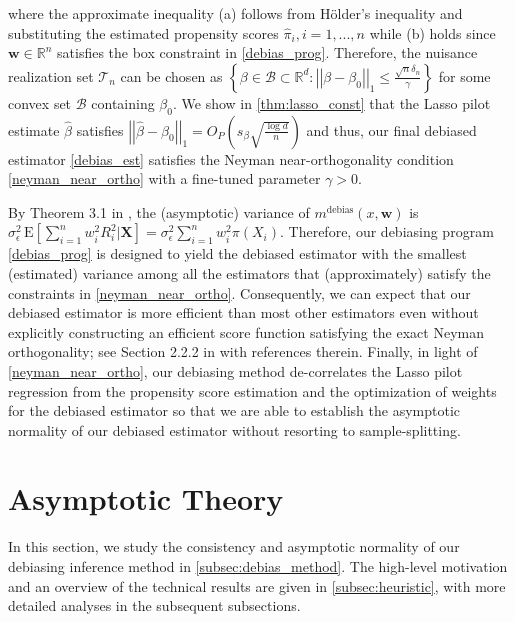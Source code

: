 \documentclass[ejsv2,noshowframe]{imsart}
\theoremstyle{plain}
\theoremstyle{definition}
\theoremstyle{remark}
\newcommand{\norm}[1]{\left|\left| #1 \right|\right|}
\renewcommand{\hat}{\widehat}
\begin{document}
where the approximate inequality (a) follows from H{\"o}lder's inequality and substituting the estimated propensity scores $\hat{\pi}_i,i=1,...,n$ while (b) holds since $\bm{w} \in \mathbb{R}^n$ satisfies the box constraint in \eqref{debias_prog}. Therefore, the nuisance realization set $\mathcal{T}_n$ can be chosen as $\left\{\beta \in \mathcal{B}\subset \mathbb{R}^d: \norm{\beta-\beta_0}_1 \leq \frac{\sqrt{n}\delta_n}{\gamma} \right\}$ for some convex set $\mathcal{B}$ containing $\beta_0$. We show in \autoref{thm:lasso_const} that the Lasso pilot estimate $\hat{\beta}$ satisfies $\norm{\hat{\beta} - \beta_0}_1=O_P\left(s_{\beta}\sqrt{\frac{\log d}{n}} \right)$ and thus, our final debiased estimator \eqref{debias_est} satisfies the Neyman near-orthogonality condition \eqref{neyman_near_ortho} with a fine-tuned parameter $\gamma >0$.

By Theorem 3.1 in \cite{chernozhukov2018double}, the (asymptotic) variance of $m^{\text{debias}}(x, \bm{w})$ is $\sigma_{\epsilon}^2\, \mathrm{E}\left[\sum_{i=1}^n w_i^2 R_i^2|\bm{X}\right] = \sigma_{\epsilon}^2 \sum_{i=1}^n w_i^2 \pi(X_i)$. Therefore, our debiasing program \eqref{debias_prog} is designed to yield the debiased estimator with the smallest (estimated) variance among all the estimators that (approximately) satisfy the constraints in \eqref{neyman_near_ortho}. Consequently, we can expect that our debiased estimator is more efficient than most other estimators even without explicitly constructing an efficient score function satisfying the exact Neyman
orthogonality; see Section 2.2.2 in \cite{chernozhukov2018double} with references therein. 
Finally, in light of \eqref{neyman_near_ortho}, our debiasing method de-correlates the Lasso pilot regression from the propensity score estimation and the optimization of weights for the debiased estimator so that we are able to establish the asymptotic normality of our debiased estimator without resorting to sample-splitting.



\section{Asymptotic Theory}
\label{sec:theory}

In this section, we study the consistency and asymptotic normality of our debiasing inference method in \autoref{subsec:debias_method}. The high-level motivation and an overview of the technical results are given in \autoref{subsec:heuristic}, with more detailed analyses in the subsequent subsections.
\end{document}
